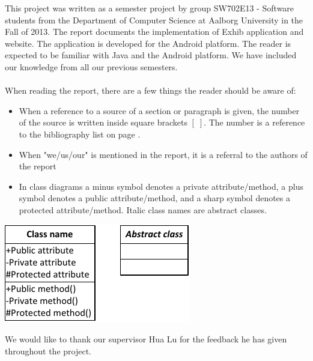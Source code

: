 This project was written as a semester project by group SW702E13 - Software students from the Department of Computer Science at Aalborg University in the Fall of 2013. The report documents the implementation of Exhib application and website. The application is developed for the Android platform. The reader is expected to be familiar with Java and the Android platform. We have included our knowledge from all our previous semesters.
\\\\
When reading the report, there are a few things the reader should be aware of:
\begin{itemize}
\item When a reference to a source of a section or paragraph is given, the number of the source is written inside square brackets $[\;]$. The number is a reference to the bibliography list on page \pageref{chap:bib}.
\item When "we/us/our" is mentioned in the report, it is a referral to the authors of the report
\item In class diagrams a minus symbol denotes a private attribute/method, a plus symbol denotes a public attribute/method, and a sharp symbol denotes a protected attribute/method. Italic class names are abstract classes.
\end{itemize}
\begin{center}
\includegraphics[width=0.35\linewidth]{img/umltheory.pdf}
\end{center}
We would like to thank our supervisor Hua Lu for the feedback he has given throughout the project.
